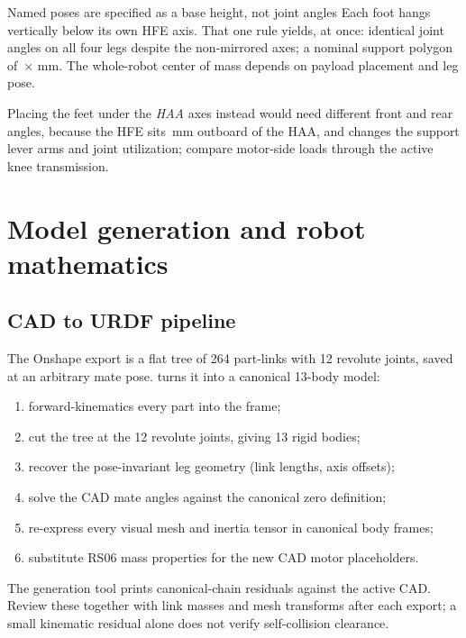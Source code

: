 \documentclass[11pt,a4paper]{article}
\begin{document}
\begin{decision}{Named poses are specified as a base height, not joint angles}
Each foot hangs vertically below its own HFE axis. That one rule yields, at
once: identical joint angles on all four legs despite the non-mirrored axes; a
nominal support polygon of \RdFootprintL\,$\times$\,\RdFootprintW\,mm.
The whole-robot center of mass depends on payload placement and leg pose.

Placing the feet under the \emph{HAA} axes instead would need different front
and rear angles, because the HFE sits \RdHfeDx\,mm outboard of the HAA, and
changes the support lever arms and joint utilization; compare motor-side
loads through the active knee transmission.
\end{decision}

\section{Model generation and robot mathematics}

\subsection{CAD to URDF pipeline}

The Onshape export is a flat tree of 264 part-links with 12 revolute joints,
saved at an arbitrary mate pose.  turns it into a
canonical 13-body model:

\begin{enumerate}
\item forward-kinematics every part into the  frame;
\item cut the tree at the 12 revolute joints, giving 13 rigid bodies;
\item recover the pose-invariant leg geometry (link lengths, axis offsets);
\item solve the CAD mate angles against the canonical zero definition;
\item re-express every visual mesh and inertia tensor in canonical body frames;
\item substitute RS06 mass properties for the new CAD motor placeholders.
\end{enumerate}

The generation tool prints canonical-chain residuals against the active CAD.
Review these together with link masses and mesh transforms after each export;
a small kinematic residual alone does not verify self-collision clearance.
\end{document}
